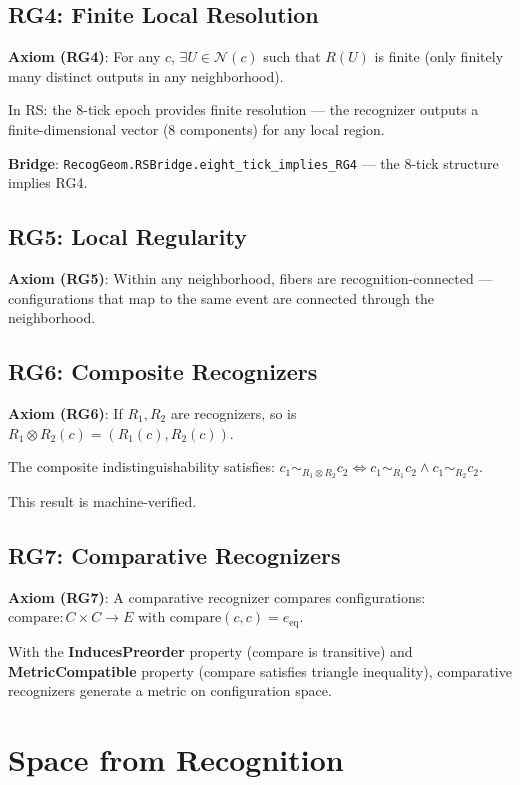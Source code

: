 \documentclass[12pt,a4paper]{article}
\theoremstyle{definition}
\theoremstyle{remark}
\begin{document}
\subsection{RG4: Finite Local Resolution}

\textbf{Axiom (RG4)}: For any $c$, $\exists U \in \mathcal{N}(c)$ such that 
$R(U)$ is finite (only finitely many distinct outputs in any neighborhood).

In RS: the 8-tick epoch provides finite resolution — the recognizer outputs a 
finite-dimensional vector (8 components) for any local region.

\textbf{Bridge}: \texttt{RecogGeom.RSBridge.eight\_tick\_implies\_RG4} — 
the 8-tick structure implies RG4.

\subsection{RG5: Local Regularity}

\textbf{Axiom (RG5)}: Within any neighborhood, fibers are recognition-connected — 
configurations that map to the same event are connected through the neighborhood.

\subsection{RG6: Composite Recognizers}

\textbf{Axiom (RG6)}: If $R_1, R_2$ are recognizers, so is $R_1 \otimes R_2(c) = (R_1(c), R_2(c))$.

The composite indistinguishability satisfies:
$c_1 \sim_{R_1 \otimes R_2} c_2 \iff c_1 \sim_{R_1} c_2 \wedge c_1 \sim_{R_2} c_2$.

This result is machine-verified.

\subsection{RG7: Comparative Recognizers}

\textbf{Axiom (RG7)}: A comparative recognizer compares configurations: 
$\text{compare}: C \times C \to E$ with $\text{compare}(c, c) = e_\mathrm{eq}$.

With the \textbf{InducesPreorder} property (compare is transitive) and 
\textbf{MetricCompatible} property (compare satisfies triangle inequality), 
comparative recognizers generate a metric on configuration space.

\section{Space from Recognition}
\end{document}
